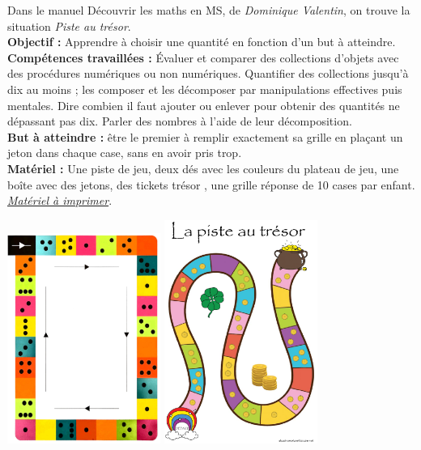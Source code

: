 \begin{exercice*}
   Dans le manuel \og Découvrir les maths \fg{} en MS, de {\it Dominique Valentin}, on trouve la situation {\it Piste au trésor}. \\ 
   {\bf Objectif :} Apprendre à choisir une quantité en fonction d'un but à atteindre. \\
   {\bf Compétences travaillées :} Évaluer et comparer des collections d’objets avec des procédures numériques ou non numériques. Quantifier des collections jusqu’à dix au moins ; les composer et les décomposer par manipulations effectives puis mentales. Dire combien il faut ajouter ou enlever pour obtenir des quantités ne dépassant pas dix. Parler des nombres à l’aide de leur décomposition. \\
   {\bf But à atteindre :} être le premier à remplir exactement sa grille en plaçant un jeton dans chaque case, sans en avoir pris trop. \\
   {\bf Matériel :} Une piste de jeu, deux dés avec les couleurs du plateau de jeu, une boîte avec des jetons, des tickets \og trésor \fg, une grille réponse de 10 cases par enfant. {\it\blue \href{https://dessinemoiunehistoire.net/wp-content/uploads/2017/02/La-piste-au-trésor-jeu-de-numération-maternelle.pdf}{Matériel à imprimer}}.
   \begin{center}
      \includegraphics[width=5cm]{Nombres_et_calculs_did/Images/Num1_activites_piste_1} \quad \includegraphics[width=5cm]{Nombres_et_calculs_did/Images/Num1_activites_piste_2}

\end{center}
\end{exercice*}
